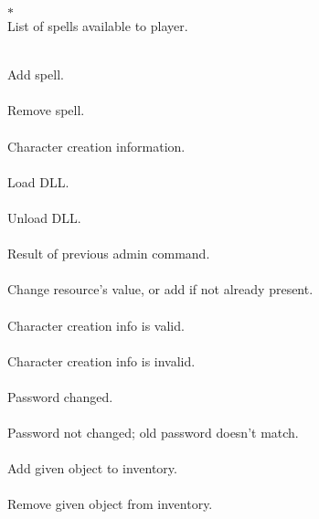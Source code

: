 \begin{protocol}
  $*$ \\
List of spells available to player. \\

  \\
Add spell. \\

  \\
Remove spell. \\

  \\
Character creation information. \\

  \\
Load DLL. \\

  \\
Unload DLL. \\

  \\
Result of previous admin command. \\

   \\
Change resource's value, or add if not already present. \\

 \\
Character creation info is valid. \\

 \\
Character creation info is invalid. \\

 \\
Password changed. \\

 \\
Password not changed; old password doesn't match. \\


  \\
Add given object to inventory. \\

  \\
Remove given object from inventory. \\


\end{protocol}
